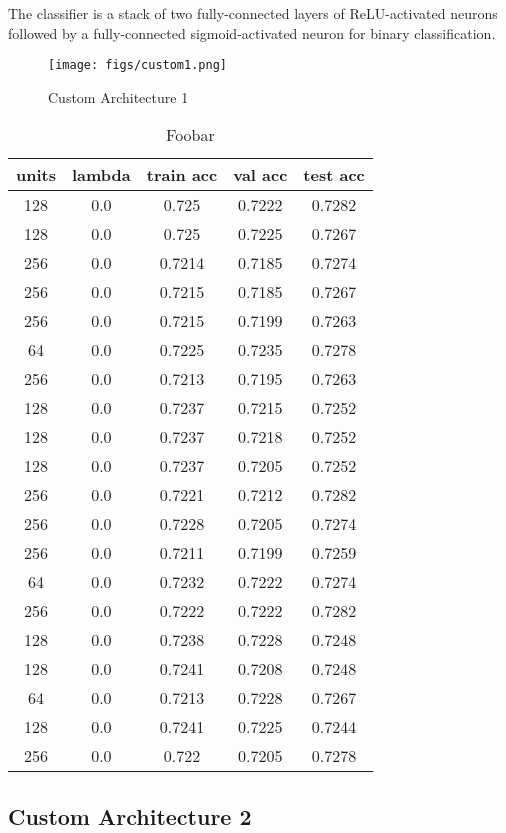 The classifier is a stack of two fully-connected layers of ReLU-activated neurons followed by a fully-connected sigmoid-activated neuron for binary classification.

\begin{figure}[h]
    \centering
    \texttt{[image: figs/custom1.png]}
    \caption{Custom Architecture 1}
    \label{fig:custom1}
\end{figure}


\begin{table}[ht]
\centering \begin{tabular}{ |c|c|c|c|c| }
\hline
units & lambda & train acc & val acc & test acc \\
\hline
128 & 0.0 & 0.725 & 0.7222 & 0.7282 \\
128 & 0.0 & 0.725 & 0.7225 & 0.7267 \\
256 & 0.0 & 0.7214 & 0.7185 & 0.7274 \\
256 & 0.0 & 0.7215 & 0.7185 & 0.7267 \\
256 & 0.0 & 0.7215 & 0.7199 & 0.7263 \\
64 & 0.0 & 0.7225 & 0.7235 & 0.7278 \\
256 & 0.0 & 0.7213 & 0.7195 & 0.7263 \\
128 & 0.0 & 0.7237 & 0.7215 & 0.7252 \\
128 & 0.0 & 0.7237 & 0.7218 & 0.7252 \\
128 & 0.0 & 0.7237 & 0.7205 & 0.7252 \\
256 & 0.0 & 0.7221 & 0.7212 & 0.7282 \\
256 & 0.0 & 0.7228 & 0.7205 & 0.7274 \\
256 & 0.0 & 0.7211 & 0.7199 & 0.7259 \\
64 & 0.0 & 0.7232 & 0.7222 & 0.7274 \\
256 & 0.0 & 0.7222 & 0.7222 & 0.7282 \\
128 & 0.0 & 0.7238 & 0.7228 & 0.7248 \\
128 & 0.0 & 0.7241 & 0.7208 & 0.7248 \\
64 & 0.0 & 0.7213 & 0.7228 & 0.7267 \\
128 & 0.0 & 0.7241 & 0.7225 & 0.7244 \\
256 & 0.0 & 0.722 & 0.7205 & 0.7278 \\
\hline
\end{tabular}
\caption{Foobar}
\label{table:foobar}
\end{table}

\subsection{Custom Architecture 2}


